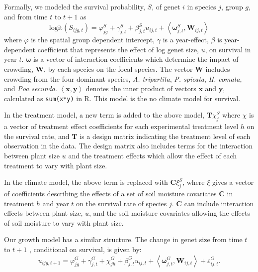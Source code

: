 \documentclass[11pt]{article}
\begin{document}
\begin{doublespacing}
Formally, we modeled the survival probability, $S$, of genet $i$ in species $j$, group $g$, and from time $t$ to $t+1$  as
\begin{equation}
\mbox{logit}(S_{ijg,t}) = \varphi_{jg}^S + \gamma_{j,t}^S  + \beta_{j,t}^S u_{ij,t} +  
\left \langle \boldsymbol{\omega}_{j,t}^S, \boldsymbol{W}_{ij,t} \right \rangle 
\label{eqn:survReg}
\end{equation}
where $\varphi$ is the spatial group dependent intercept, $\gamma$ is a year-effect, $\beta$ is year-dependent coefficient that represents the effect of log genet size, $u$, on survival in year $t$. $\boldsymbol{\omega}$ is a vector of interaction coefficients which determine the impact of crowding, $\boldsymbol{W}$, by each species on the focal species. The vector $\boldsymbol{W}$ includes crowding from the four dominant species, \textit{A. tripartita}, \textit{P. spicata}, \textit{H. comata}, and \textit{Poa secunda}. 
$\left \langle \boldsymbol{x, y} \right \rangle$ denotes the inner product of vectors $\boldsymbol{x}$ and $\boldsymbol{y}$, 
calculated as \texttt{sum(x*y)} in R. This model is the no climate model for survival.

In the treatment model, a new term is added to the above model, $\boldsymbol{T}\chi_{j}^S$ where $\chi$ is a vector of treatment effect coefficients for each experimental treatment level $h$ on the survival rate, and $\boldsymbol{T}$ is a design matrix indicating the treatment level of each observation in the data. The design matrix also includes terms for the interaction between plant size $u$ and the treatment effects which allow the effect of each treatment to vary with plant size.  

In the climate model, the above term is replaced with $\boldsymbol{C}\xi_{j}^S$, where $\xi$ gives a vector of coefficients describing the effects of a set of soil moisture covariates $\boldsymbol{C}$ in treatment $h$ and year $t$ on the survival rate of species $j$. $\boldsymbol{C}$ can include interaction effects between plant size, $u$, and the soil moisture covariates allowing the effects of soil moisture to vary with plant size. 

Our growth model has a similar structure. The change in genet size from time $t$ to $t+1$ , conditional on survival, is given by:
\begin{equation}
u_{ijg,t+1} = \varphi_{jg}^G + \gamma_{j,t}^G + \chi_{jh}^G  + \beta_{j,t}^G u_{ij,t} + 
\left \langle  \boldsymbol{\omega}_{j,t}^G, \boldsymbol{W}_{ij,t} \right \rangle + \varepsilon_{ij,t}^G .
\label{eqn:growReg}
\end{equation}


\end{doublespacing}
\end{document}
